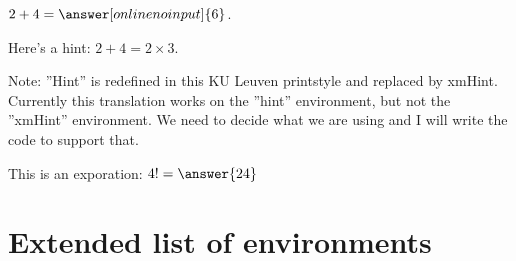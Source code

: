 \documentclass{ximera}
\begin{document}
        \begin{exercise} $2+4=\answer[onlinenoinput]{6}$.
            \begin{hint}
                Here's a hint: $2 + 4 = 2 \times 3$.
            \end{hint}
            Note: ''Hint'' is redefined in this KU Leuven printstyle and replaced by xmHint. Currently this translation works on the ''hint'' environment, but not the ''xmHint'' environment. We need to decide what we are using and I will write the code to support that.

            This is an exporation: $4!  = \answer{24}$
        \end{exercise}
            




\section*{Extended list of environments}%
\end{document}

